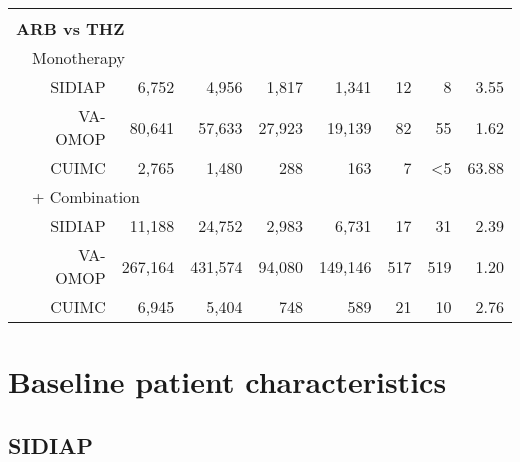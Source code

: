 \documentclass[11pt,]{article}
\begin{document}
\begin{longtable}{p{-2em}p{-2em}rrrrrrrr}
   \rowcolor{white} \\ \multicolumn{9}{l}{\textbf{ARB vs THZ}} \\ & \multicolumn{9}{l}{Monotherapy}  \\ &  & SIDIAP & 6,752 & 4,956 & 1,817 & 1,341 & 12 & 8 & 3.55 \\ 
   &  & VA-OMOP & 80,641 & 57,633 & 27,923 & 19,139 & 82 & 55 & 1.62 \\ 
   &  & CUIMC & 2,765 & 1,480 & 288 & 163 & 7 & <5 & 63.88 \\ 
                           & \multicolumn{8}{l}{+ Combination} \\ &  & SIDIAP & 11,188 & 24,752 & 2,983 & 6,731 & 17 & 31 & 2.39 \\ 
   &  & VA-OMOP & 267,164 & 431,574 & 94,080 & 149,146 & 517 & 519 & 1.20 \\ 
   &  & CUIMC & 6,945 & 5,404 & 748 & 589 & 21 & 10 & 2.76 \\ 
  
  \bottomrule
\end{longtable}

\clearpage

\hypertarget{baseline-patient-characteristics}{%
\section{Baseline patient
characteristics}\label{baseline-patient-characteristics}}

\hypertarget{sidiap}{%
\subsection{SIDIAP}\label{sidiap}}
\end{document}
